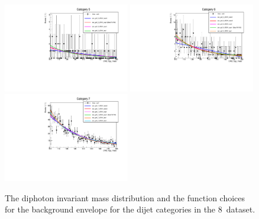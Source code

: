 \begin{figure}
  \includegraphics[width=0.49\textwidth]{analysis/plots/mva_8TeV/multipdf_cat5.pdf}
  \includegraphics[width=0.49\textwidth]{analysis/plots/mva_8TeV/multipdf_cat6.pdf}\\
  \includegraphics[width=0.49\textwidth]{analysis/plots/mva_8TeV/multipdf_cat7.pdf}
  \caption{The diphoton invariant mass distribution and the function choices for the background envelope for the dijet categories in the 8~\TeV dataset. }
  \label{fig:multipdf5}
\end{figure}

